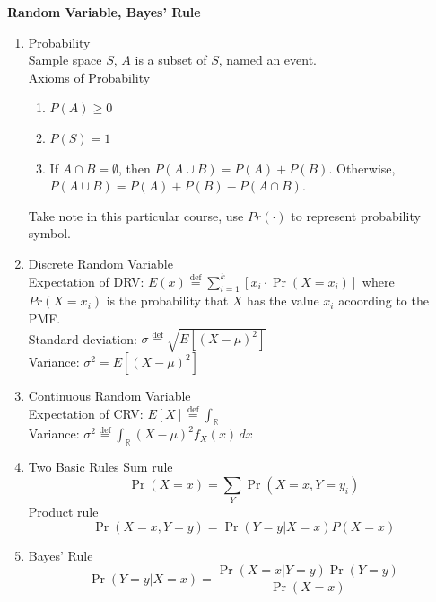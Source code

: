 \documentclass{article}
\begin{document}
\textbf{Random Variable, Bayes' Rule}
\begin{enumerate}
    \item Probability \\
    Sample space $S$, $A$ is a subset of $S$, named an event. \\
    Axioms of Probability
    \begin{enumerate}
        \item $P(A) \geq 0$
        \item $P(S) = 1$
        \item If $A \cap B = \emptyset$, then $P(A \cup B) = P(A) + P(B)$. Otherwise, $P(A \cup B) = P(A) + P(B) - P(A \cap B)$.
    \end{enumerate} 
    Take note in this particular course, use $Pr(\cdot)$ to represent probability symbol.
    \item Discrete Random Variable \\
    Expectation of DRV: \(E(x) \overset{\text{def}}{=} \sum_{i=1}^{k} [x_i \cdot \Pr(X = x_i)]\)
    where $Pr(X = x_i)$ is the probability that $X$ has the value $x_i$ acoording to the PMF.\\
    Standard deviation: \(\sigma \overset{\text{def}}{=} \sqrt{E\left[(X - \mu)^2\right]}\) \\
    Variance: \(\sigma^2 = E\left[(X - \mu)^2\right]\) \\
    \item Continuous Random Variable \\
    Expectation of CRV: \(E[X] \overset{\text{def}}{=} \int_{\mathbb{R}}\) \\
    Variance: \(\sigma^2 \overset{\text{def}}{=} \int_{\mathbb{R}} (X - \mu)^2 f_X(x) \, dx\) \\
    \item Two Basic Rules
    Sum rule
    \[\Pr(X = x) = \sum_{Y} \Pr(X = x, Y = y_i)\]
    Product rule
    \[\Pr(X = x, Y = y) = \Pr(Y = y | X = x) P(X = x)\]
    \item Bayes' Rule
    \[\Pr(Y = y | X = x) = \frac{\Pr(X = x | Y = y) \Pr(Y = y)}{\Pr(X = x)}\]
\end{enumerate}
\end{document}
